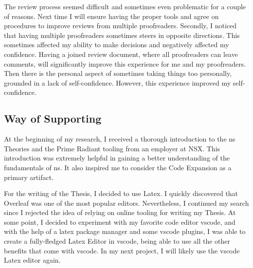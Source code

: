 The review process seemed difficult and sometimes even problematic for a couple of
reasons. Next time I will ensure having the proper tools and agree on procedures to
improve reviews from multiple proofreaders. Secondly, I noticed that having multiple
proofreaders sometimes steers in opposite directions. This sometimes affected my ability
to make decisions and negatively affected my confidence. Having a joined review document,
where all proofreaders can leave comments, will significantly improve this experience for
me and my proofreaders. Then there is the personal aspect of sometimes taking things too
personally, grounded in a lack of self-confidence. However, this experience improved my
self-confidence. 

\subsection{Way of Supporting}

At the beginning of my research, I received a thorough introduction to the \gls{ns}
Theories and the Prime Radiant tooling from an employer at NSX. This introduction was
extremely helpful in gaining a better understanding of the fundamentals of \gls{ns}. It
also inspired me to consider the Code Expansion as a primary artifact. 

For the writing of the Thesis, I decided to use Latex. I quickly discovered that Overleaf
was one of the most popular editors. Nevertheless, I continued my search since I rejected
the idea of relying on online tooling for writing my Thesis. At some point, I decided to
experiment with my favorite code editor \gls{vscode}, and with the help of a latex package
manager and some \gls{vscode} plugins, I was able to create a fully-fledged Latex Editor
in \gls{vscode}, being able to use all the other benefits that come with \gls{vscode}. In
my next project, I will likely use the \gls{vscode} Latex editor again.
